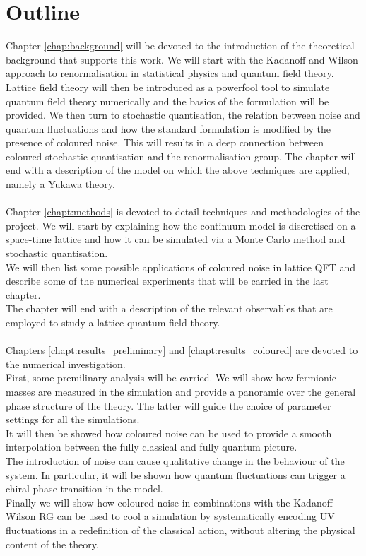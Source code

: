 \section{Outline}
Chapter \ref{chap:background} will be devoted to the introduction of the theoretical background that supports this work. 
We will start with the Kadanoff and Wilson approach to renormalisation in statistical physics and quantum field theory. 
Lattice field theory will then be introduced as a powerfool tool to simulate quantum field theory numerically and the basics of the formulation will be provided. 
We then turn to stochastic quantisation, the relation between noise and quantum fluctuations and how the standard formulation is modified by the presence of coloured noise. 
This will results in a deep connection between coloured stochastic quantisation and the renormalisation group.
The chapter will end with a description of the model on which the above techniques are applied, namely a Yukawa theory. \\~\\
Chapter \ref{chapt:methods} is devoted to detail techniques and methodologies of the project. We will start by explaining how the continuum model is discretised on a space-time lattice and how it can be simulated via a Monte Carlo method and stochastic quantisation. \\
We will then list some possible applications of coloured noise in lattice QFT and describe some of the numerical experiments that will be carried in the last chapter.\\
The chapter will end with a description of the relevant observables that are employed to study a lattice quantum field theory. \\~\\
Chapters \ref{chapt:results_preliminary} and \ref{chapt:results_coloured} are devoted to the numerical investigation. \\
First, some premilinary analysis will be carried. We will show how fermionic masses are measured in the simulation and provide a panoramic over the general phase structure of the theory. The latter will guide the choice of parameter settings for all the simulations. \\
It will then be showed how coloured noise can be used to provide a smooth interpolation between the fully classical and fully quantum picture. \\
The introduction of noise can cause qualitative change in the behaviour of the system. In particular, it will be shown how quantum fluctuations can trigger a chiral phase transition in the model. \\
Finally we will show how coloured noise in combinations with the Kadanoff-Wilson RG can be used to cool a simulation by systematically encoding UV fluctuations in a redefinition of the classical action, without altering the physical content of the theory.